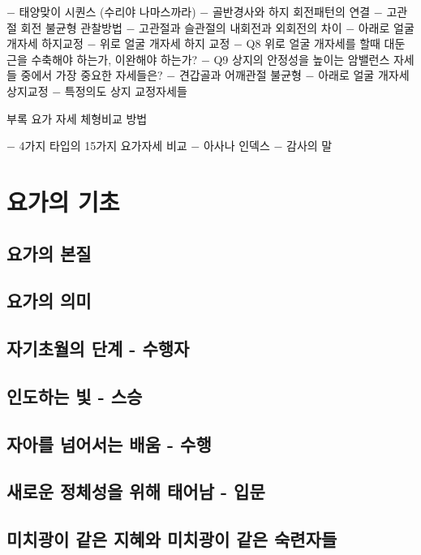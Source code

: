 \documentclass[12pt, a4paper, oneside]{book}
\let\stdsection\section
\renewcommand\section{\newpage\stdsection}
\begin{document}
$-$ 태양맞이 시퀀스 (수리야 나마스까라) 
$-$ 골반경사와 하지 회전패턴의 연결 
$-$ 고관절 회전 불균형 관찰방법 
$-$ 고관절과 슬관절의 내회전과 외회전의 차이 
$-$ 아래로 얼굴 개자세 하지교정 
$-$ 위로 얼굴 개자세 하지 교정 
$-$ Q8 위로 얼굴 개자세를 할때 대둔근을 수축해야 하는가, 이완해야 하는가? 
$-$ Q9 상지의 안정성을 높이는 암밸런스 자세들 중에서 가장 중요한 자세들은? 
$-$ 견갑골과 어깨관절 불균형 
$-$ 아래로 얼굴 개자세 상지교정 
$-$ 특정의도 상지 교정자세들 

부록 요가 자세 체형비교 방법 

$-$ 4가지 타입의 15가지 요가자세 비교 
$-$ 아사나 인덱스 
$-$ 감사의 말

%
%
%
\chapter{요가의 기초}
\minitoc%


\section{요가의 본질}

\section{요가의 의미}

\section{자기초월의 단계 - 수행자}

\section{인도하는 빛 - 스승}


\section{자아를 넘어서는 배움 - 수행}


\section{새로운 정체성을 위해 태어남 - 입문}


\section{미치광이 같은 지혜와 미치광이 같은 숙련자들 }
\end{document}
